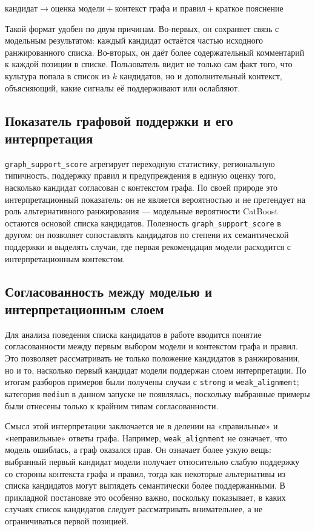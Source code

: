 \begin{center}\(
\text{кандидат}
\rightarrow
\text{оценка модели}
+
\text{контекст графа и правил}
+
\text{краткое пояснение}
\)\end{center}

Такой формат удобен по двум причинам. Во-первых, он сохраняет связь с модельным
результатом: каждый кандидат остаётся частью исходного ранжированного списка.
Во-вторых, он даёт более содержательный комментарий к каждой позиции в списке.
Пользователь видит не только сам факт того, что культура попала в список из
\(k\) кандидатов, но и дополнительный контекст, объясняющий, какие сигналы её
поддерживают или ослабляют.

\subsection{Показатель графовой поддержки и его интерпретация}

\texttt{graph\_support\_score} агрегирует переходную статистику,
региональную типичность, поддержку правил и предупреждения в единую
оценку того, насколько кандидат согласован с контекстом графа.
По своей природе это интерпретационный показатель: он не является
вероятностью и не претендует на роль альтернативного ранжирования —
модельные вероятности CatBoost остаются основой списка кандидатов.
Полезность \texttt{graph\_support\_score} в другом: он позволяет
сопоставлять кандидатов по степени их семантической поддержки и
выделять случаи, где первая рекомендация модели расходится
с интерпретационным контекстом.

\subsection{Согласованность между моделью и интерпретационным слоем}

Для анализа поведения списка кандидатов в работе вводится понятие согласованности
между первым выбором модели и контекстом графа и правил. Это позволяет рассматривать
не только положение кандидатов в ранжировании, но и то, насколько первый кандидат
модели поддержан слоем интерпретации. По итогам разборов примеров были получены
случаи с \texttt{strong} и \texttt{weak\_alignment}; категория \texttt{medium}
в данном запуске не появлялась, поскольку выбранные примеры были отнесены только
к крайним типам согласованности.

Смысл этой интерпретации заключается не в делении на «правильные» и «неправильные»
ответы графа. Например, \texttt{weak\_alignment} не означает, что модель ошиблась,
а граф оказался прав. Он означает более узкую вещь: выбранный первый кандидат модели
получает относительно слабую поддержку со стороны контекста графа и правил, тогда как
некоторые альтернативы из списка кандидатов могут выглядеть семантически более
поддержанными. В прикладной постановке это особенно важно, поскольку показывает,
в каких случаях список кандидатов следует рассматривать внимательнее, а не
ограничиваться первой позицией.

